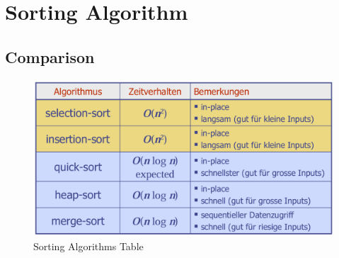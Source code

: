 \documentclass[../Main.tex]{subfiles}
\begin{document}
\chapter{Sorting Algorithm}

\intro{

}

\section{Comparison}

\begin{figure}[H]
    \centering
    \includegraphics[width=0.75\linewidth]{Images/sort-leadboard-table.png}
    \caption{Sorting Algorithms Table}
\end{figure}
\end{document}
